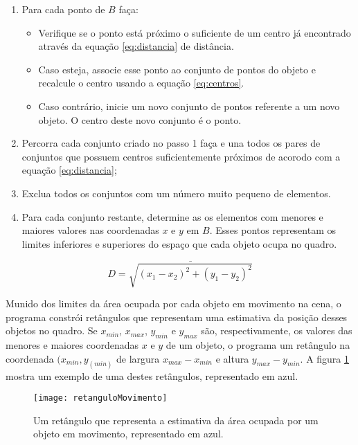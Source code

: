 \begin{enumerate}
\item Para cada ponto de $B$ faça: 
	\begin{itemize}
		\item Verifique se o ponto está próximo o suficiente de um centro já 				encontrado através da equação \ref{eq:distancia} de distância.
		\item Caso esteja, associe esse ponto ao conjunto de pontos do objeto e 			recalcule o centro usando a equação \ref{eq:centros}. 
		\item Caso contrário, inicie um novo conjunto de pontos referente a um 				novo objeto. O centro deste novo conjunto é o ponto.
	\end{itemize}

\item Percorra cada conjunto criado no passo 1 faça e una todos os pares de conjuntos que possuem centros suficientemente próximos de acorodo com a equação \ref{eq:distancia};

\item Exclua todos os conjuntos com um número muito pequeno de elementos.

\item Para cada conjunto restante, determine as os elementos com menores e maiores valores nas coordenadas $x$ e $y$ em $B$. Esses pontos representam os limites inferiores e superiores do espaço que cada objeto ocupa no quadro.
\end{enumerate}

\begin{equation}
D = \bar{\sqrt{(x_1-x_2)^2+(y_1-y_2)^2}}
\label{eq:distancia}
\end{equation}

Munido dos limites da área ocupada por cada objeto em movimento na cena, o programa constrói retângulos que representam uma estimativa da posição desses objetos no quadro. Se $x_{min}$, $x_{max}$, $y_{min}$ e $y_{max}$ são, respectivamente, os valores das menores e maiores coordenadas $x$ e $y$ de um objeto, o programa um retângulo na coordenada $(x_{min},y_(min)$ de largura $x_{max}-x_{min}$ e altura $y_{max}-y_{min}$. A figura \ref{fig:retanguloMovimento} mostra um exemplo de uma destes retângulos, representado em azul.

\begin{figure}
\centering
\texttt{[image: retanguloMovimento]}
\centering
\caption{Um retângulo que representa a estimativa da área ocupada por um objeto em movimento, representado em azul.}
\label{fig:retanguloMovimento}
\end{figure}

